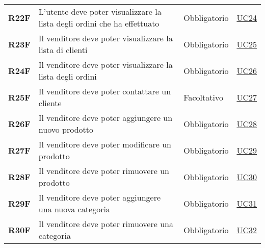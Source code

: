 \begin{center}
\begin{longtable}[!h]{p{50px} p{245px} p{75px} p{50px}}
        \textbf{R22F}                         & L'utente deve poter visualizzare la lista degli ordini che ha effettuato                                                                               & Obbligatorio             & \hyperref[sec:UC24]{UC24}                      \\
        \textbf{R23F}                         & Il venditore deve poter visualizzare la lista di clienti                                                                                               & Obbligatorio             & \hyperref[sec:UC25]{UC25}                      \\
        \textbf{R24F}                         & Il venditore deve poter visualizzare la lista degli ordini                                                                                             & Obbligatorio             & \hyperref[sec:UC26]{UC26}                      \\
        \textbf{R25F}                         & Il venditore deve poter contattare un cliente                                                                                                          & Facoltativo              & \hyperref[sec:UC27]{UC27}                      \\
        \textbf{R26F}                         & Il venditore deve poter aggiungere un nuovo prodotto                                                                                                   & Obbligatorio             & \hyperref[sec:UC28]{UC28}                      \\
        \textbf{R27F}                         & Il venditore deve poter modificare un prodotto                                                                                                         & Obbligatorio             & \hyperref[sec:UC29]{UC29}                      \\
        \textbf{R28F}                         & Il venditore deve poter rimuovere un prodotto                                                                                                          & Obbligatorio             & \hyperref[sec:UC30]{UC30}                      \\
        \textbf{R29F}                         & Il venditore deve poter aggiungere una nuova categoria                                                                                                 & Obbligatorio             & \hyperref[sec:UC31]{UC31}                      \\
        \textbf{R30F}                         & Il venditore deve poter rimuovere una categoria                                                                                                        & Obbligatorio             & \hyperref[sec:UC32]{UC32}                      \\

\end{longtable}
\end{center}

